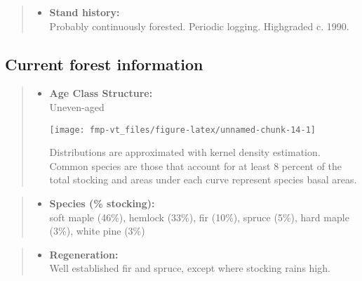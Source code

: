 \documentclass[]{tufte-handout}
\providecommand{\tightlist}{%
  \setlength{\itemsep}{0pt}\setlength{\parskip}{0pt}}
\begin{document}
\begin{quote}
\begin{itemize}
\tightlist
\item
  \textbf{Stand history:}\\
  \vspace{2pt} Probably continuously forested. Periodic logging.
  Highgraded c. 1990.
\end{itemize}
\end{quote}

\subsection{Current forest
information}\label{current-forest-information-2}

\begin{quote}
\begin{itemize}
\tightlist
\item
  \textbf{Age Class Structure:}\\
  \vspace{2pt} Uneven-aged\\

  \begin{marginfigure}
  \texttt{[image: fmp-vt\_files/figure-latex/unnamed-chunk-14-1]} \caption[Distributions are approximated with kernel density estimation]{Distributions are approximated with kernel density estimation. Common species are those that account for at least 8 percent of the total stocking and areas under each curve represent species basal areas.}\label{fig:unnamed-chunk-14}
  \end{marginfigure}
\end{itemize}
\end{quote}

\begin{quote}
\begin{itemize}
\tightlist
\item
  \textbf{Species (\% stocking):}\\
  \vspace{2pt} soft maple (46\%), hemlock (33\%), fir (10\%), spruce
  (5\%), hard maple (3\%), white pine (3\%)
\end{itemize}
\end{quote}

\begin{quote}
\begin{itemize}
\tightlist
\item
  \textbf{Regeneration:}\\
  \vspace{2pt} Well established fir and spruce, except where stocking
  rains high.
\end{itemize}
\end{quote}
\end{document}
